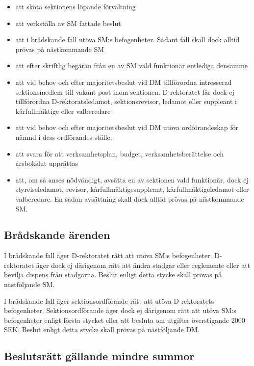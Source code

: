 \documentclass{dgovdoc}
\begin{document}
\begin{itemize}
  \item att sköta sektionens löpande förvaltning
  \item att verkställa av SM fattade beslut
  \item att i brådskande fall utöva SM:s befogenheter. Sådant fall skall dock
    alltid prövas på nästkommande SM
  \item att efter skriftlig begäran från en av SM vald funktionär entlediga
    densamme
  \item att vid behov och efter majoritetsbeslut vid DM tillförordna
    intresserad sektionsmedlem till vakant post inom sektionen. D-rektoratet
    får dock ej tillförordna D-rektoratsledamot, sektionsrevisor, ledamot eller
    suppleant i kårfullmäktige eller valberedare
  \item att vid behov och efter majoritetsbeslut vid DM utöva ordförandeskap
    för nämnd i dess ordförandes ställe.
  \item att svara för att verksamhetsplan, budget, verksamhetsberättelse och
    årsbokslut upprättas
  \item att, om så anses nödvändigt, avsätta en av sektionen vald funktionär,
    dock ej styrelseledamot, revisor, kårfullmäktigesuppleant,
    kårfullmäktigeledamot eller valberedare. En sådan avsättning skall dock
    alltid prövas på nästkommande SM.
\end{itemize}

\subsection{Brådskande ärenden}

I brådskande fall äger D-rektoratet rätt att utöva SM:s befogenheter.
D-rektoratet äger dock ej därigenom rätt att ändra stadgar eller reglemente
eller att bevilja dispens från stadgarna. Beslut enligt detta stycke skall
prövas på nästföljande SM.

I brådskande fall äger sektionsordförande rätt att utöva D-rektoratets
befogenheter. Sektionsordförande äger dock ej därigenom rätt att utöva SM:s
befogenheter enligt första stycket eller att besluta om utgifter överstigande
2000 SEK. Beslut enligt detta stycke skall prövas på nästföljande DM.

\subsection{Beslutsrätt gällande mindre summor}
\end{document}

